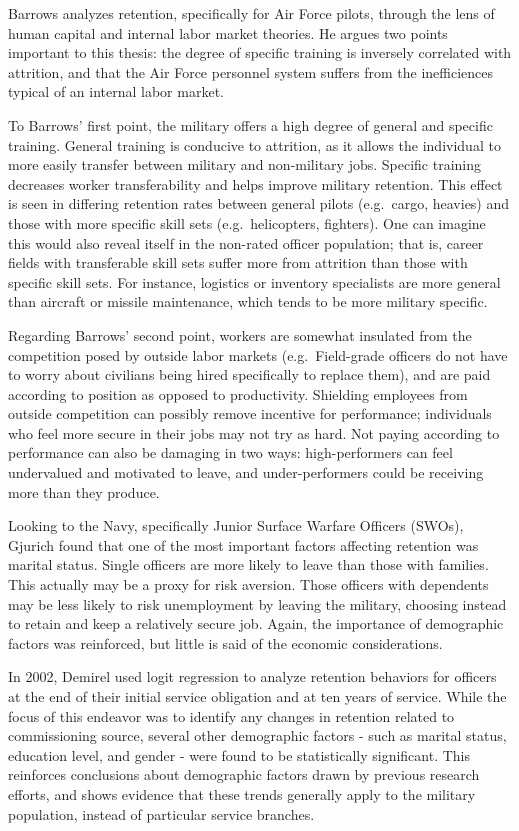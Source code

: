 \documentclass[12pt,letterpaper,toc=flat,oneside]{report}
\theoremstyle{definition}
\theoremstyle{definition}
\theoremstyle{definition}
\theoremstyle{remark}
\begin{document}
Barrows \cite{barrows-1993} analyzes retention, specifically for Air
Force pilots, through the lens of human capital and internal labor
market theories. He argues two points important to this thesis: the
degree of specific training is inversely correlated with attrition, and
that the Air Force personnel system suffers from the inefficiences
typical of an internal labor market.

To Barrows' first point, the military offers a high degree of general
and specific training. General training is conducive to attrition, as it
allows the individual to more easily transfer between military and
non-military jobs. Specific training decreases worker transferability
and helps improve military retention. This effect is seen in differing
retention rates between general pilots (e.g.~cargo, heavies) and those
with more specific skill sets (e.g.~helicopters, fighters). One can
imagine this would also reveal itself in the non-rated officer
population; that is, career fields with transferable skill sets suffer
more from attrition than those with specific skill sets. For instance,
logistics or inventory specialists are more general than aircraft or
missile maintenance, which tends to be more military specific.

Regarding Barrows' second point, workers are somewhat insulated from the
competition posed by outside labor markets (e.g.~Field-grade officers do
not have to worry about civilians being hired specifically to replace
them), and are paid according to position as opposed to productivity.
Shielding employees from outside competition can possibly remove
incentive for performance; individuals who feel more secure in their
jobs may not try as hard. Not paying according to performance can also
be damaging in two ways: high-performers can feel undervalued and
motivated to leave, and under-performers could be receiving more than
they produce.

Looking to the Navy, specifically Junior Surface Warfare Officers
(SWOs), Gjurich \cite{gjurich-1999} found that one of the most important
factors affecting retention was marital status. Single officers are more
likely to leave than those with families. This actually may be a proxy
for risk aversion. Those officers with dependents may be less likely to
risk unemployment by leaving the military, choosing instead to retain
and keep a relatively secure job. Again, the importance of demographic
factors was reinforced, but little is said of the economic
considerations.

In 2002, Demirel \cite{demirel-2002} used logit regression to analyze
retention behaviors for officers at the end of their initial service
obligation and at ten years of service. While the focus of this endeavor
was to identify any changes in retention related to commissioning
source, several other demographic factors - such as marital status,
education level, and gender - were found to be statistically
significant. This reinforces conclusions about demographic factors drawn
by previous research efforts, and shows evidence that these trends
generally apply to the military population, instead of particular
service branches.
\end{document}
